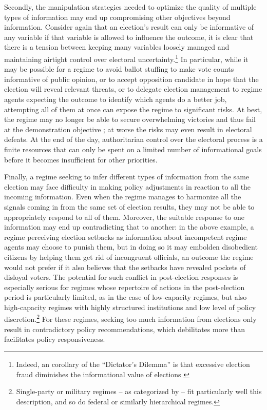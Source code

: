 \documentclass[12pt]{article}
\newcommand{\1}{\mathbbm{1}}
\begin{document}
Secondly, the manipulation strategies needed to optimize the quality of multiple types of information may end up compromising other objectives beyond information. Consider again that an election's result can only be informative of any variable if that variable is allowed to influence the outcome, it is clear that there is a tension between keeping many variables loosely managed and maintaining airtight control over electoral uncertainty.\footnote{Indeed, an corollary of the ``Dictator's Dilemma'' is that excessive election fraud diminishes the informational value of elections \citep{Wintrobe2000}} In particular, while it may be possible for a regime to avoid ballot stuffing to make vote counts informative of public opinion, or to accept opposition candidate in hope that the election will reveal relevant threats, or to delegate election management to regime agents expecting the outcome to identify which agents do a better job, attempting all of them at once can expose the regime to significant risks. At best, the regime may no longer be able to secure overwhelming victories and thus fail at the demonstration objective \citep{Geddes2005}; at worse the risks may even result in electoral defeats. At the end of the day, authoritarian control over the electoral process is a finite resources that can only be spent on a limited number of informational goals before it becomes insufficient for other priorities.

Finally, a regime seeking to infer different types of information from the same election may face difficulty in making policy adjustments in reaction to all the incoming information. Even when the regime manages to harmonize all the signals coming in from the same set of election results, they may not be able to appropriately respond to all of them. Moreover, the suitable response to one information may end up contradicting that to another: in the above example, a regime perceiving election setbacks as information about incompetent regime agents may choose to punish them, but in doing so it may embolden disobedient citizens by helping them get rid of incongruent officials, an outcome the regime would not prefer if it also believes that the setbacks have revealed pockets of disloyal voters. The potential for such conflict in post-election responses is especially serious for regimes whose repertoire of actions in the post-election period is particularly limited, as in the case of low-capacity regimes, but also high-capacity regimes with highly structured institutions and low level of policy discretion.\footnote{Single-party or military regimes -- as categorized by \citet{GeddesWrightFrantz2014} -- fit particularly well this description, and so do federal or similarly hierarchical regimes.} For these regimes, seeking too much information from elections only result in contradictory policy recommendations, which debilitates more than facilitates policy responsiveness.
\end{document}
